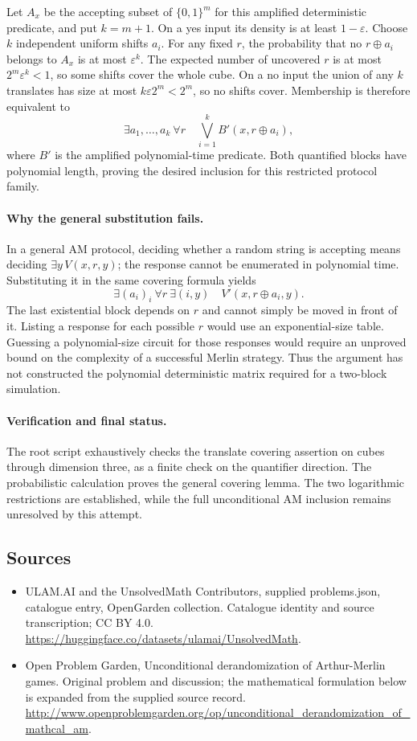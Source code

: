 \documentclass[11pt,a4paper]{article}
\begin{document}
Let $A_x$ be the accepting subset of $\{0,1\}^m$
for this amplified deterministic predicate, and
put $k=m+1$. On a yes input its density is at
least $1-\varepsilon$. Choose $k$ independent
uniform shifts $a_i$. For any fixed $r$, the
probability that no $r\mathbin\oplus a_i$
belongs to $A_x$ is at most $\varepsilon^k$.
The expected number of uncovered $r$ is at most
$2^m\varepsilon^k<1$, so some shifts cover the
whole cube. On a no input the union of any $k$
translates has size at most $k\varepsilon2^m<2^m$,
so no shifts cover. Membership is therefore
equivalent to
\[
 \exists a_1,\ldots,a_k\ \forall r\quad
             \bigvee_{i=1}^k B'(x,r\mathbin\oplus a_i),
\]
where $B'$ is the amplified polynomial-time
predicate. Both quantified blocks have polynomial
length, proving the desired inclusion for this
restricted protocol family.

\paragraph{Why the general substitution fails.}
In a general AM protocol, deciding whether a
random string is accepting means deciding
$\exists y\,V(x,r,y)$; the response cannot be
enumerated in polynomial time. Substituting it
in the same covering formula yields
\[
 \exists(a_i)_i\ \forall r\ \exists(i,y)\quad
                   V'(x,r\mathbin\oplus a_i,y).
\]
The last existential block depends on $r$ and
cannot simply be moved in front of it. Listing
a response for each possible $r$ would use an
exponential-size table. Guessing a polynomial-size
circuit for those responses would require an
unproved bound on the complexity of a successful
Merlin strategy. Thus the argument has not
constructed the polynomial deterministic matrix
required for a two-block simulation.

\paragraph{Verification and final status.}
The root script exhaustively checks the translate
covering assertion on cubes through dimension
three, as a finite check on the quantifier
direction. The probabilistic calculation proves
the general covering lemma. The two logarithmic
restrictions are established, while the full
unconditional AM inclusion remains unresolved
by this attempt.

\subsection{Sources}
\begin{itemize}
\item[S1] ULAM.AI and the UnsolvedMath Contributors, supplied problems.json, catalogue entry, OpenGarden collection. Catalogue identity and source transcription; CC BY 4.0.
\url{https://huggingface.co/datasets/ulamai/UnsolvedMath}.
\item[S2] Open Problem Garden, Unconditional derandomization of Arthur-Merlin games. Original problem and discussion; the mathematical formulation below is expanded from the supplied source record.
\url{http://www.openproblemgarden.org/op/unconditional_derandomization_of_mathcal_am}.

\end{itemize}
\end{document}
